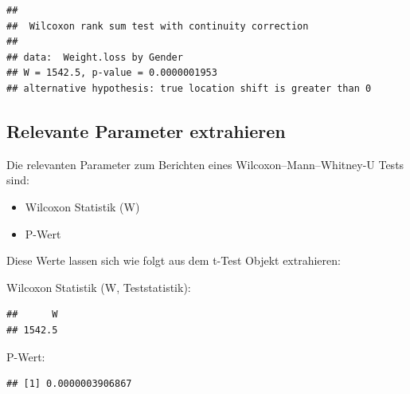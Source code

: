 \documentclass[
]{book}
\newenvironment{Shaded}{\begin{snugshade}}{\end{snugshade}}
\newcommand{\AttributeTok}[1]{\textcolor[rgb]{0.13,0.29,0.53}{#1}}
\newcommand{\ConstantTok}[1]{\textcolor[rgb]{0.56,0.35,0.01}{#1}}
\newcommand{\FunctionTok}[1]{\textcolor[rgb]{0.13,0.29,0.53}{\textbf{#1}}}
\newcommand{\NormalTok}[1]{#1}
\newcommand{\SpecialCharTok}[1]{\textcolor[rgb]{0.81,0.36,0.00}{\textbf{#1}}}
\providecommand{\tightlist}{%
  \setlength{\itemsep}{0pt}\setlength{\parskip}{0pt}}
\begin{document}
\begin{verbatim}
## 
##  Wilcoxon rank sum test with continuity correction
## 
## data:  Weight.loss by Gender
## W = 1542.5, p-value = 0.0000001953
## alternative hypothesis: true location shift is greater than 0
\end{verbatim}

\subsection{Relevante Parameter extrahieren}\label{relevante-parameter-extrahieren-2}

Die relevanten Parameter zum Berichten eines Wilcoxon--Mann--Whitney-U Tests sind:

\begin{itemize}
\tightlist
\item
  Wilcoxon Statistik (W)
\item
  P-Wert
\end{itemize}

Diese Werte lassen sich wie folgt aus dem t-Test Objekt extrahieren:

Wilcoxon Statistik (W, Teststatistik):

\begin{Shaded}
\end{Shaded}

\begin{verbatim}
##      W 
## 1542.5
\end{verbatim}

P-Wert:

\begin{Shaded}
\end{Shaded}

\begin{verbatim}
## [1] 0.0000003906867
\end{verbatim}
\end{document}
